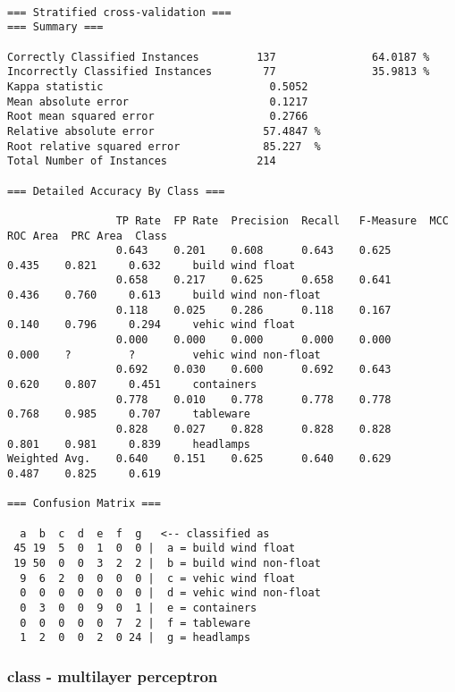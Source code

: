 \documentclass[a4paper]{article}
\begin{document}
\begin{verbatim}

=== Stratified cross-validation ===
=== Summary ===

Correctly Classified Instances         137               64.0187 %
Incorrectly Classified Instances        77               35.9813 %
Kappa statistic                          0.5052
Mean absolute error                      0.1217
Root mean squared error                  0.2766
Relative absolute error                 57.4847 %
Root relative squared error             85.227  %
Total Number of Instances              214

=== Detailed Accuracy By Class ===

                 TP Rate  FP Rate  Precision  Recall   F-Measure  MCC      ROC Area  PRC Area  Class
                 0.643    0.201    0.608      0.643    0.625      0.435    0.821     0.632     build wind float
                 0.658    0.217    0.625      0.658    0.641      0.436    0.760     0.613     build wind non-float
                 0.118    0.025    0.286      0.118    0.167      0.140    0.796     0.294     vehic wind float
                 0.000    0.000    0.000      0.000    0.000      0.000    ?         ?         vehic wind non-float
                 0.692    0.030    0.600      0.692    0.643      0.620    0.807     0.451     containers
                 0.778    0.010    0.778      0.778    0.778      0.768    0.985     0.707     tableware
                 0.828    0.027    0.828      0.828    0.828      0.801    0.981     0.839     headlamps
Weighted Avg.    0.640    0.151    0.625      0.640    0.629      0.487    0.825     0.619

=== Confusion Matrix ===

  a  b  c  d  e  f  g   <-- classified as
 45 19  5  0  1  0  0 |  a = build wind float
 19 50  0  0  3  2  2 |  b = build wind non-float
  9  6  2  0  0  0  0 |  c = vehic wind float
  0  0  0  0  0  0  0 |  d = vehic wind non-float
  0  3  0  0  9  0  1 |  e = containers
  0  0  0  0  0  7  2 |  f = tableware
  1  2  0  0  2  0 24 |  g = headlamps

\end{verbatim}


\subsubsection{class - multilayer perceptron}
\end{document}
